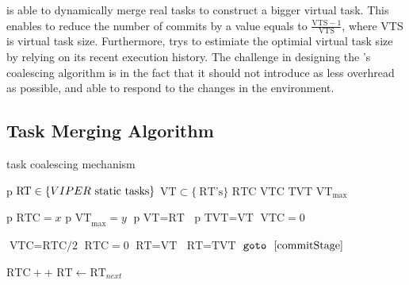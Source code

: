\sys is able to dynamically merge real tasks to construct a bigger virtual task. This enables \sys to reduce the number of commits by a value equals to 
$\frac{\text{VTS}-1}{\text{VTS}}$, 
where VTS is virtual task size. Furthermore, \sys trys to estimiate the optimial virtual task size by relying on its recent execution history. The challenge in designing the \sys's coalescing algorithm is in the fact that it should not introduce as less overhread as possible, and able to respond to the changes in the environment. 

\subsection{Task Merging Algorithm}

\begin{algorithm}[t]
	\caption{\sys task coalescing mechanism}
	\label{algo:coalescing}
	\scriptsize
	\begin{algorithmic}[1]
		\State $\text{p}$  
		\State $\text{RT} \in \{VIPER~\text{static tasks}\}$  
		\State $\text{VT} \subset \{~\text{RT's}\}$  
		\State $\text{RTC}$  
		\State $\text{VTC}$  
		\State $\text{TVT}$ 
		\State $\text{VT}_{\max}$ 
		\vspace{0.1cm}
		
		\State $\text{p RTC} = x $ 
		\State $\text{p VT}_{\max} = y$
		\State $\text{p VT} = \text{RT}$ 
		\State $\text{p TVT} = \text{VT} $ 
		\State $\text{VTC} = 0 $ 
		\vspace{0.1cm}


			\State $\text{VTC} = \text{RTC/2} $  \label{algo:coalescing:executionHistory1}
			\State $\text{RTC} = 0 $
			\State $\text{RT} = \text{VT}$  \label{algo:coalescing:virtualProgressing1}
				\State $\text{RT}=\text{TVT}$
				\State $\texttt{goto} \ \ \ref{commitStage}$ \label{algo:coalescing:firmTransition1}
			\EndIf
			\vspace{0.1cm}

					\EndFunction
						\State $\text{RTC}++$  \label{algo:coalescing:realTaskCounter}
					\EndIf
					\State $\text{RT} \leftarrow \text{RT}_{next}$ 
				\EndWhile        \label{algo:coalescing:virtualProgressing2}


\end{algorithmic}
\end{algorithm}
